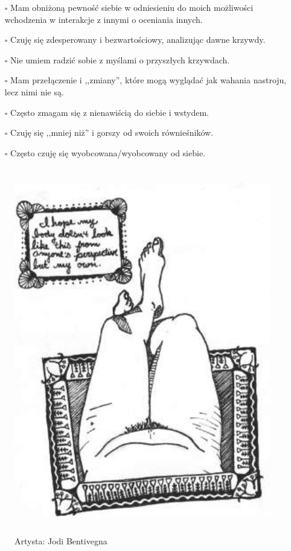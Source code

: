 \begin{multicols}{2}
\begin{itemize}
\item[$\square$]{Mam obniżoną pewność siebie w odniesieniu do moich możliwości wchodzenia w interakcje z innymi o oceniania innych.}
\item[$\square$]{Czuję się zdesperowany i bezwartościowy, analizując dawne krzywdy.}
\item[$\square$]{Nie umiem radzić sobie z myślami o przyszłych krzywdach.}
\item[$\square$]{Mam przełączenie i ,,zmiany'', które mogą wyglądać jak wahania nastroju, lecz nimi nie są.}
\item[$\square$]{Często zmagam się z nienawiścią do siebie i wstydem.}
\item[$\square$]{Czuję się ,,mniej niż'' i gorszy od swoich równieśników.}
\item[$\square$]{Często czuję się wyobcowana/wyobcowany od siebie.}
\end{itemize}
\end{multicols}

\begin{figure}[h]
\centering
\includegraphics[height=16cm]{TeX_files/2-2.png}
\caption{Artysta: Jodi Bentivegna}
\label{2-2}
\end{figure}

